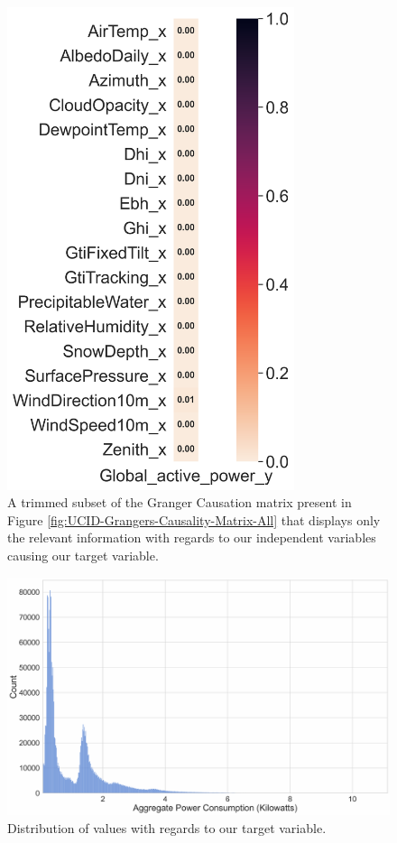 \begin{figure}[H]
    \centering
    \includegraphics[width=0.75\textwidth]{Images/Chapter 5/UCID/UCID-Grangers-Causality-Matrix-Single.png}
    \caption{A trimmed subset of the Granger Causation matrix present in Figure \ref{fig:UCID-Grangers-Causality-Matrix-All} that displays only the relevant information with regards to our independent variables causing our target variable.}
    \label{fig:UCID-Grangers-Causality-Matrix-Single}
\end{figure}

\begin{figure}[H]
    \centering
    \includegraphics[width=\textwidth]{Images/Chapter 6/Stage 3/UCID/UCID-GAP-Distribution.pdf}
    \caption{Distribution of values with regards to our target variable.}
    \label{fig:UCID-GAP-Distribution}
\end{figure}


